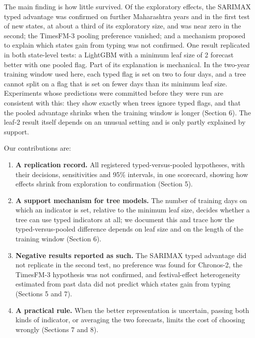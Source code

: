 \documentclass[review,12pt,authoryear]{elsarticle}
\begin{document}
The main finding is how little survived. Of the exploratory effects, the SARIMAX typed advantage was confirmed on further Maharashtra years and in the first test of new states, at about a third of its exploratory size, and was near zero in the second; the TimesFM-3 pooling preference vanished; and a mechanism proposed to explain which states gain from typing was not confirmed. One result replicated in both state-level tests: a LightGBM with a minimum leaf size of 2 forecast better with one pooled flag. Part of its explanation is mechanical. In the two-year training window used here, each typed flag is set on two to four days, and a tree cannot split on a flag that is set on fewer days than its minimum leaf size. Experiments whose predictions were committed before they were run are consistent with this: they show exactly when trees ignore typed flags, and that the pooled advantage shrinks when the training window is longer (Section 6). The leaf-2 result itself depends on an unusual setting and is only partly explained by support.

Our contributions are:

\begin{enumerate}
\def\labelenumi{\arabic{enumi}.}
\item
  \textbf{A replication record.} All registered typed-versus-pooled hypotheses, with their decisions, sensitivities and 95\% intervals, in one scorecard, showing how effects shrink from exploration to confirmation (Section 5).
\item
  \textbf{A support mechanism for tree models.} The number of training days on which an indicator is set, relative to the minimum leaf size, decides whether a tree can use typed indicators at all; we document this and trace how the typed-versus-pooled difference depends on leaf size and on the length of the training window (Section 6).
\item
  \textbf{Negative results reported as such.} The SARIMAX typed advantage did not replicate in the second test, no preference was found for Chronos-2, the TimesFM-3 hypothesis was not confirmed, and festival-effect heterogeneity estimated from past data did not predict which states gain from typing (Sections 5 and 7).
\item
  \textbf{A practical rule.} When the better representation is uncertain, passing both kinds of indicator, or averaging the two forecasts, limits the cost of choosing wrongly (Sections 7 and 8).
\end{enumerate}
\end{document}
